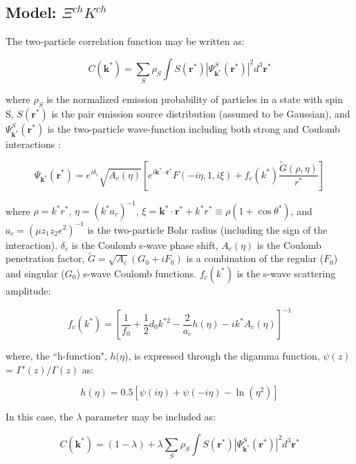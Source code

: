 \documentclass[../AnalysisNoteJBuxton.tex]{subfiles}
\begin{document}
\subsection{Model: \texorpdfstring{$\Xi^{ch}K^{ch}$}{TEXT}}
\label{ModelCascadeKaon}

The two-particle correlation function may be written as:

\begin{equation}
 C(\mathbf{k^{*}}) = \sum\limits_{S}\rho_{S}\int S(\mathbf{r^{*}})|\Psi^{S}_{\mathbf{k^{*}}}(\mathbf{r^{*}})|^{2}d^{3}\mathbf{r^{*}}
\label{eqn:GenCfEqn}
\end{equation}

where $\rho_{S}$ is the normalized emission probability of particles in a state with spin S, $S(\mathbf{r}^{*})$ is the pair emission source distribution (assumed to be Gaussian), and $\Psi^{S}_{\mathbf{k}^{*}}(\mathbf{r}^{*})$ is the two-particle wave-function including both strong and Coulomb interactions \cite{Lednicky:2005tb}:

\begin{equation}
 \Psi_{\mathbf{k^{*}}}(\mathbf{r^{*}}) = e^{i\delta_{c}}\sqrt{A_{c}(\eta)}[e^{i\mathbf{k^{*}} \cdot \mathbf{r^{*}}}F(-i\eta,1,i\xi) + f_{c}(k^{*})\frac{\tilde{G}(\rho,\eta)}{r^{*}}]
\label{eqn:CoulombWaveFcn}
\end{equation}

where $\rho = k^{*}r^{*}$, $\eta = (k^{*}a_{c})^{-1}$, $\xi = \mathbf{k^{*}} \cdot \mathbf{r^{*}} + k^{*}r^{*} \equiv \rho(1+\cos\theta^{*})$, and $a_{c} = (\mu z_{1}z_{2}e^{2})^{-1}$ is the two-particle Bohr radius (including the sign of the interaction).  $\delta_{c}$ is the Coulomb s-wave phase shift, $A_{c}(\eta)$ is the Coulomb penetration factor, $\tilde{G} = \sqrt{A_{c}}(G_{0} + iF_{0})$ is a combination of the regular ($F_{0}$) and singular ($G_{0}$) s-wave Coulomb functions.  $f_{c}(k^{*})$ is the s-wave scattering amplitude:

\begin{equation}
 f_{c}(k^{*}) = [\frac{1}{f_{0}} + \frac{1}{2}d_{0}k^{*2} - \frac{2}{a_{c}}h(\eta) - ik^{*}A_{c}(\eta)]^{-1}
\label{eqn:CoulombScattAmp}
\end{equation}

where, the ``h-function", $h(\eta$), is expressed through the digamma function, $\psi(z)$ = $\Gamma'(z)/\Gamma(z)$ as:

\begin{equation}
 h(\eta) = 0.5[\psi(i\eta) + \psi(-i\eta) - \ln(\eta^{2})]
\label{eqn:LednickyHFunction}
\end{equation} 

In this case, the $\lambda$ parameter may be included as: 

\begin{equation}
 C(\mathbf{k^{*}}) = (1 - \lambda) + \lambda\sum\limits_{S}\rho_{S}\int S(\mathbf{r^{*}})|\Psi^{S}_{\mathbf{k^{*}}}(\mathbf{r^{*}})|^{2}d^{3}\mathbf{r^{*}}
\label{eqn:GenCfEqnwLambda}
\end{equation}
\end{document}
